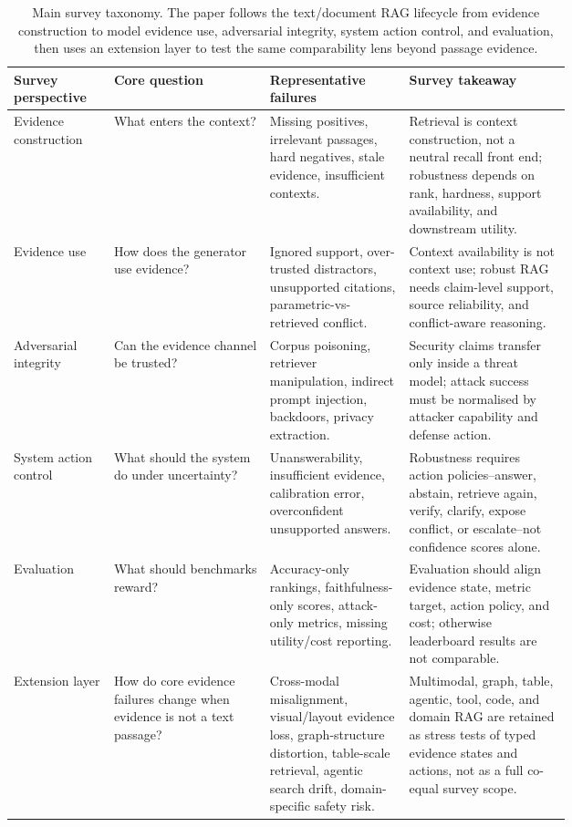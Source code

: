 \begin{table}[t]
\centering
\scriptsize
\renewcommand{\arraystretch}{0.9}
\begin{tabularx}{\linewidth}{>{\raggedright\arraybackslash}p{0.18\linewidth}>{\raggedright\arraybackslash}p{0.28\linewidth}>{\raggedright\arraybackslash}p{0.25\linewidth}X}
\toprule
\textbf{Survey perspective} & \textbf{Core question} & \textbf{Representative failures} & \textbf{Survey takeaway} \\
\midrule
Evidence construction & What enters the context? & Missing positives, irrelevant passages, hard negatives, stale evidence, insufficient contexts. & Retrieval is context construction, not a neutral recall front end; robustness depends on rank, hardness, support availability, and downstream utility. \\
Evidence use & How does the generator use evidence? & Ignored support, over-trusted distractors, unsupported citations, parametric-vs-retrieved conflict. & Context availability is not context use; robust RAG needs claim-level support, source reliability, and conflict-aware reasoning. \\
Adversarial integrity & Can the evidence channel be trusted? & Corpus poisoning, retriever manipulation, indirect prompt injection, backdoors, privacy extraction. & Security claims transfer only inside a threat model; attack success must be normalised by attacker capability and defense action. \\
System action control & What should the system do under uncertainty? & Unanswerability, insufficient evidence, calibration error, overconfident unsupported answers. & Robustness requires action policies--answer, abstain, retrieve again, verify, clarify, expose conflict, or escalate--not confidence scores alone. \\
Evaluation & What should benchmarks reward? & Accuracy-only rankings, faithfulness-only scores, attack-only metrics, missing utility/cost reporting. & Evaluation should align evidence state, metric target, action policy, and cost; otherwise leaderboard results are not comparable. \\
Extension layer & How do core evidence failures change when evidence is not a text passage? & Cross-modal misalignment, visual/layout evidence loss, graph-structure distortion, table-scale retrieval, agentic search drift, domain-specific safety risk. & Multimodal, graph, table, agentic, tool, code, and domain RAG are retained as stress tests of typed evidence states and actions, not as a full co-equal survey scope. \\
\bottomrule
\end{tabularx}
\caption{Main survey taxonomy. The paper follows the text/document RAG lifecycle from evidence construction to model evidence use, adversarial integrity, system action control, and evaluation, then uses an extension layer to test the same comparability lens beyond passage evidence.}
\label{tab:survey-main-line}
\end{table}
